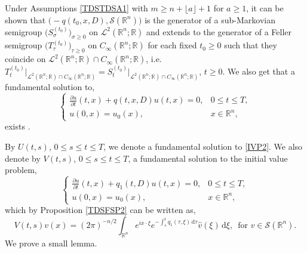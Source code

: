 \documentclass[a4paper, 12pt]{report}
\theoremstyle{remark}
\theoremstyle{definition}
\begin{document}
Under Assumptions \ref{TDSTDSA1} with $m \ge n + \lfloor a \rfloor + 1$ for $a \ge 1$, it can be shown that $\big(-q(t_0, x, D), \mathcal{S}(\mathbb{R}^n)\big)$ is the generator of a sub-Markovian semigroup $\big(S_\sigma^{(t_0)}\big)_{\sigma \ge 0}$ on $\mathcal{L}^2(\mathbb{R}^n; \mathbb{R})$ and extends to the generator of a Feller semigroup $\big(T_\tau^{(t_0)}\big)_{\tau \ge 0}$ on $C_\infty(\mathbb{R}^n; \mathbb{R})$ for each fixed $t_0 \ge 0$ such that they coincide on $\mathcal{L}^2(\mathbb{R}^n; \mathbb{R}) \cap C_\infty(\mathbb{R}^n; \mathbb{R})$, i.e. $T_t^{(t_0)}\big|_{\mathcal{L}^2(\mathbb{R}^n; \mathbb{R}) \cap C_\infty(\mathbb{R}^n; \mathbb{R})} = S_t^{(t_0)}\big|_{\mathcal{L}^2(\mathbb{R}^n; \mathbb{R}) \cap C_\infty(\mathbb{R}^n; \mathbb{R})}$, $t \ge 0$.  We also get that a fundamental solution to,
\begin{equation}
\begin{cases}
\frac{\partial u}{\partial t}(t, x) + q(t, x, D)u(t, x) = 0, & 0 \le t \le T,\\
u(0, x) = u_0(x), & x \in \mathbb{R}^n,\label{IVP2}
\end{cases}
\end{equation}
exists \cite[Theorem 8.18]{RZ}.

By $U(t, s)$, $0 \le s \le t \le T$, we denote a fundamental solution to \eqref{IVP2}.  We also denote by $V(t, s)$, $0 \le s \le t \le T$, a fundamental solution to the initial value problem,
\begin{equation}
\begin{cases}
\frac{\partial u}{\partial t}(t, x) + q_1(t, D)u(t, x) = 0, & 0 \le t \le T,\\
u(0, x) = u_0(x), & x \in \mathbb{R}^n,\label{IVP3}
\end{cases}
\end{equation}
which by Proposition \ref{TDSFSP2} can be written as,
$$
V(t, s)v(x) = (2\pi)^{-n/2}\int_{\mathbb{R}^n}e^{ix\cdot\xi}e^{-\int_s^tq_1(\tau, \xi)\,\mathrm{d}\tau}\hat{v}(\xi)\,\mathrm{d}\xi, \,\,\, \text{for } v \in \mathcal{S}(\mathbb{R}^n).
$$
We prove a small lemma.
\end{document}
